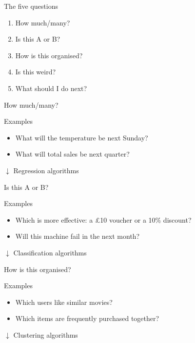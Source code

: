\begin{frame}{The five questions}
    \begin{enumerate}
        \item How much/many?
        \item Is this A or B?
        \item How is this organised?
        \item Is this weird?
        \item What should I do next?
    \end{enumerate}
\end{frame}

\begin{frame}{How much/many?}
    \begin{block}{Examples}
        \begin{itemize}
            \item What will the temperature be next Sunday?
            \item What will total sales be next quarter?
        \end{itemize}
    \end{block}
    \begin{center}
        \large%
        $\downarrow$
        \vfill
        \alert{Regression} algorithms
    \end{center}
\end{frame}

\begin{frame}{Is this A or B?}
    \begin{block}{Examples}
        \begin{itemize}
            \item Which is more effective: a £10 voucher or a 10\% discount?
            \item Will this machine fail in the next month?
        \end{itemize}
    \end{block}
    \begin{center}
        \large%
        $\downarrow$
        \vfill
        \alert{Classification} algorithms
    \end{center}
\end{frame}

\begin{frame}{How is this organised?}
    \begin{block}{Examples}
        \begin{itemize}
            \item Which users like similar movies?
            \item Which items are frequently purchased together?
        \end{itemize}
    \end{block}
    \begin{center}
        \large%
        $\downarrow$
        \vfill
        \alert{Clustering} algorithms
    \end{center}
\end{frame}

